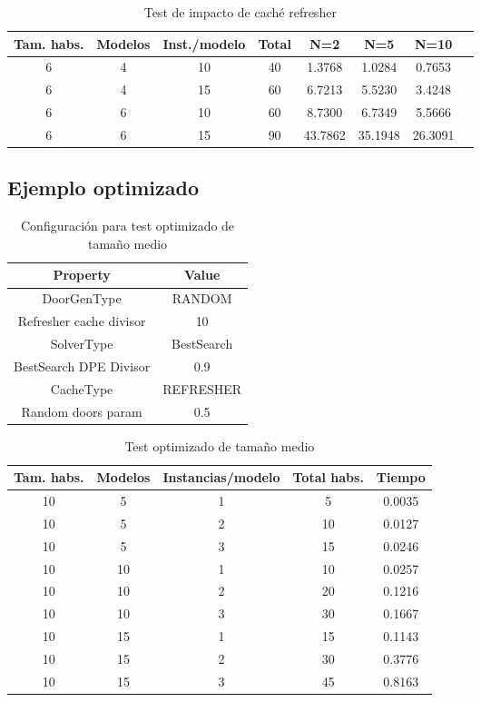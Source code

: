 \begin{table}[H]
\begin{center}
	\begin{tabular}{ | c | c | c | c | c | c | c | c |}
\hline
Tam. habs. & Modelos & Inst./modelo & Total & N=2 & N=5 & N=10 \\ \hline 
6 & 4 & 10 & 40 & 1.3768 & 1.0284 & 0.7653 \\ 
6 & 4 & 15 & 60 & 6.7213 & 5.5230 & 3.4248 \\ 
6 & 6 & 10 & 60 & 8.7300 & 6.7349 & 5.5666 \\ 
6 & 6 & 15 & 90 & 43.7862 & 35.1948 & 26.3091 \\ 
\hline
	\end{tabular}
\end{center}
\caption{Test de impacto de caché refresher}
\label{table:refresher}
\end{table}


\subsection{Ejemplo optimizado}

\begin{table}[H]
\begin{center}
	\begin{tabular}{ | c | c | }
\hline
 		Property & Value \\ \hline
DoorGenType & RANDOM \\ 
Refresher cache divisor & 10 \\ 
SolverType & BestSearch \\ 
BestSearch DPE Divisor & 0.9 \\ 
CacheType & REFRESHER \\ 
Random doors param & 0.5 \\ 
\hline
	\end{tabular}
\end{center}
\caption{Configuración para test optimizado de tamaño medio}
\label{table:cfg-bsoptmedsamp}
\end{table}

\begin{table}[H]
\begin{center}
	\begin{tabular}{ | c | c | c | c | c | }
\hline
Tam. habs. & Modelos & Instancias/modelo & Total habs. & Tiempo \\ \hline 
10 & 5 & 1 & 5 & 0.0035 \\ 
10 & 5 & 2 & 10 & 0.0127 \\ 
10 & 5 & 3 & 15 & 0.0246 \\ 
10 & 10 & 1 & 10 & 0.0257 \\ 
10 & 10 & 2 & 20 & 0.1216 \\ 
10 & 10 & 3 & 30 & 0.1667 \\ 
10 & 15 & 1 & 15 & 0.1143 \\ 
10 & 15 & 2 & 30 & 0.3776 \\ 
10 & 15 & 3 & 45 & 0.8163 \\ 
\hline
	\end{tabular}
\end{center}
\caption{Test optimizado de tamaño medio}
\label{table:bsoptmedsamp}
\end{table}


